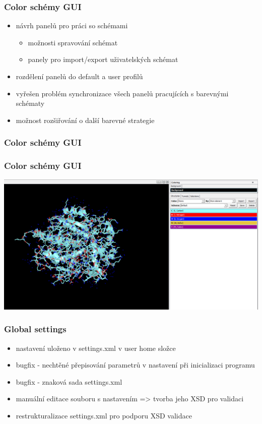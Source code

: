 \documentclass[slovak]{beamer}
\begin{document}
\begin{frame}
\frametitle{Color schémy GUI}
	\begin{itemize}
		\item návrh panelů pro práci so schémami
		\begin{itemize}
			\item možnosti spravování schémat
			\item panely pro import/export uživatelských schémat
		\end{itemize}
		\item rozdělení panelů do default a user profilů
		\item vyřešen problém synchronizace všech panelů pracujících s barevnými schématy
		\item možnost rozšiřování o další barevné strategie
	\end{itemize}
\end{frame}

\begin{frame}
\frametitle{Color schémy GUI}
	\frametitle{Color schémy GUI}
	\includegraphics[width=\linewidth]{colorpanel.jpg}
\end{frame}

\begin{frame}
\frametitle{Global settings}
	\begin{itemize}
		\item nastavení uloženo v settings.xml v user home složce
		\item bugfix - nechtěné přepisování parametrů v nastavení při inicializaci programu
		\item bugfix - znaková sada settings.xml
		\item manuální editace souboru s nastavením => tvorba jeho XSD pro validaci
		\item restrukturalizace settings.xml pro podporu XSD validace
	\end{itemize}
\end{frame}
\end{document}
